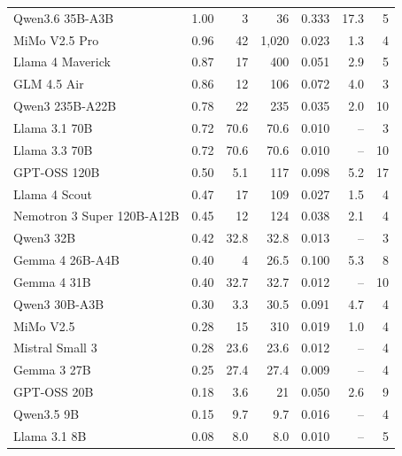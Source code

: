 \documentclass[11pt]{article}
\begin{document}
\begin{table}[t]
\begin{tabular}{lrrrrrr}
Qwen3.6 35B-A3B            & 1.00  & 3    & 36      & 0.333 & 17.3 & 5  \\
MiMo V2.5 Pro              & 0.96  & 42   & 1{,}020 & 0.023 & 1.3  & 4  \\
Llama 4 Maverick           & 0.87  & 17   & 400     & 0.051 & 2.9  & 5  \\
GLM 4.5 Air                & 0.86  & 12   & 106     & 0.072 & 4.0  & 3  \\
Qwen3 235B-A22B            & 0.78  & 22   & 235     & 0.035 & 2.0  & 10 \\
Llama 3.1 70B              & 0.72  & 70.6 & 70.6    & 0.010 & --   & 3  \\
Llama 3.3 70B              & 0.72  & 70.6 & 70.6    & 0.010 & --   & 10 \\
GPT-OSS 120B               & 0.50  & 5.1  & 117     & 0.098 & 5.2  & 17 \\
Llama 4 Scout              & 0.47  & 17   & 109     & 0.027 & 1.5  & 4  \\
Nemotron 3 Super 120B-A12B & 0.45  & 12   & 124     & 0.038 & 2.1  & 4  \\
Qwen3 32B                  & 0.42  & 32.8 & 32.8    & 0.013 & --   & 3  \\
Gemma 4 26B-A4B            & 0.40  & 4    & 26.5    & 0.100 & 5.3  & 8  \\
Gemma 4 31B                & 0.40  & 32.7 & 32.7    & 0.012 & --   & 10 \\
Qwen3 30B-A3B              & 0.30  & 3.3  & 30.5    & 0.091 & 4.7  & 4  \\
MiMo V2.5                  & 0.28  & 15   & 310     & 0.019 & 1.0  & 4  \\
Mistral Small 3            & 0.28  & 23.6 & 23.6    & 0.012 & --   & 4  \\
Gemma 3 27B                & 0.25  & 27.4 & 27.4    & 0.009 & --   & 4  \\
GPT-OSS 20B                & 0.18  & 3.6  & 21      & 0.050 & 2.6  & 9  \\
Qwen3.5 9B                 & 0.15  & 9.7  & 9.7     & 0.016 & --   & 4  \\
Llama 3.1 8B               & 0.08  & 8.0  & 8.0     & 0.010 & --   & 5  \\
\bottomrule
\end{tabular}
\end{table}
\end{document}
